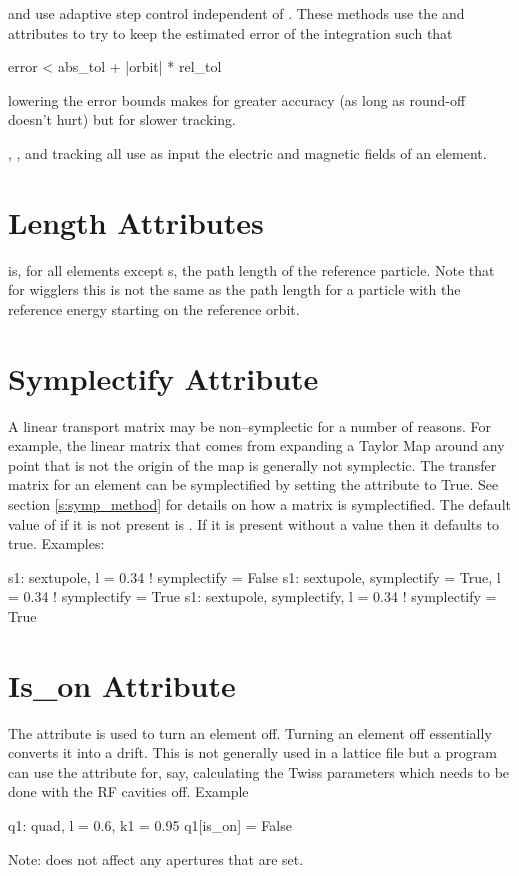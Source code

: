  and  use adaptive step
control independent of . These methods use the  and
 attributes to try to keep the estimated error of the integration
such that
\begin{example}
  error < abs\_tol + |orbit| * rel_tol
\end{example}
lowering the error bounds makes for greater accuracy (as long as round-off 
doesn't hurt) but for slower tracking. 

, , and  tracking all use
as input the electric and magnetic fields of an element. 

\section{Length Attributes}
\label{s:l}

 is, for all elements except s, the path length 
of the reference particle.
Note that for wigglers this is not the same as the path length for
a particle with the reference energy starting on the reference orbit.

\section{Symplectify Attribute}
\label{s:symp}

A linear transport matrix may be non--symplectic for a number of reasons.
For example, the linear matrix that comes from expanding a Taylor Map
around any point that is not the origin of the map is generally not 
symplectic. The transfer matrix for an element can be symplectified by
setting the  attribute to True. See section \ref{s:symp_method}
for details on how a matrix is symplectified. The default value of  
if it is not present is . If it is present without a value then
it defaults to true. Examples:
\begin{example}
  s1: sextupole, l = 0.34                       ! symplectify = False
  s1: sextupole, symplectify = True, l = 0.34   ! symplectify = True
  s1: sextupole, symplectify, l = 0.34          ! symplectify = True
\end{example}

\section{Is\_on Attribute}
\label{s:is_on}

The  attribute is used to turn an element off. Turning
an element off essentially converts it into a drift. This is not
generally used in a lattice file but a program can use the attribute
for, say, calculating the Twiss parameters which needs to be done
with the RF cavities off. Example
\begin{example}
  q1: quad, l = 0.6, k1 = 0.95
  q1[is_on] = False
\end{example}
Note:  does not affect any apertures that are set.